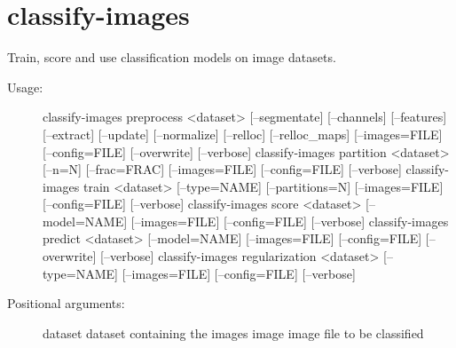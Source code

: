 \documentclass[letterpaper,10pt,english]{sphinxmanual}
\begin{document}
\section{classify-images}
\label{index:classify-images}\label{index:module-flamingo.classify}
Train, score and use classification models on image datasets.
\begin{description}
\item[{Usage:}] \leavevmode
classify-images preprocess \textless{}dataset\textgreater{} {[}--segmentate{]} {[}--channels{]} {[}--features{]} {[}--extract{]} {[}--update{]} {[}--normalize{]} {[}--relloc{]} {[}--relloc\_maps{]} {[}--images=FILE{]} {[}--config=FILE{]} {[}--overwrite{]} {[}--verbose{]}
classify-images partition \textless{}dataset\textgreater{} {[}--n=N{]} {[}--frac=FRAC{]} {[}--images=FILE{]} {[}--config=FILE{]} {[}--verbose{]}
classify-images train \textless{}dataset\textgreater{} {[}--type=NAME{]} {[}--partitions=N{]} {[}--images=FILE{]} {[}--config=FILE{]} {[}--verbose{]}
classify-images score \textless{}dataset\textgreater{} {[}--model=NAME{]} {[}--images=FILE{]} {[}--config=FILE{]} {[}--verbose{]}
classify-images predict \textless{}dataset\textgreater{} {[}--model=NAME{]} {[}--images=FILE{]} {[}--config=FILE{]} {[}--overwrite{]} {[}--verbose{]}
classify-images regularization \textless{}dataset\textgreater{} {[}--type=NAME{]} {[}--images=FILE{]} {[}--config=FILE{]} {[}--verbose{]}

\item[{Positional arguments:}] \leavevmode
dataset            dataset containing the images
image              image file to be classified


\end{description}
\end{document}
